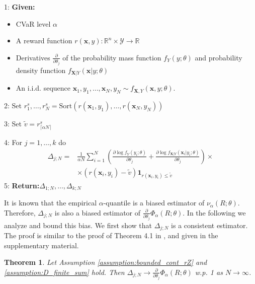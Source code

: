 \documentclass[letterpaper]{article}
\newcommand{\R}{\mathbb{R}}
\newcommand{\cvar}{\Phi_\alpha}
\newcommand{\var}{\nu_\alpha}
\newcommand{\cY}{\mathcal{Y}}
\newcommand{\bx}{\mathbf{x}}
\newcommand{\bX}{\mathbf{X}}
\newcommand{\Dth}{\frac{\partial}{\partial \theta_j}}
\newcommand{\Dt}[1]{\frac{\partial {#1}}{\partial \theta_j}}
\newcommand{\dcvar}{\Delta_{j;N}} %
\newcommand{\evar}{\tilde{v}}  %
\newcommand{\alggiven}{\textbf{Given:}}
\newcommand{\algreturn}{\textbf{Return:}}
\newtheorem{theorem}{Theorem}
\begin{document}
\begin{algorithm} \label{alg:GCVaR}
\caption{\texttt{GCVaR}}
1: \alggiven
\begin{itemize}
\item CVaR level $\alpha$
\item A reward function $r(\bx,y):\R^n\times \cY \to \R$
\item Derivatives $\Dt{}$ of the probability mass function $f_Y\left(y;\theta\right)$ and probability density function $f_{\bX|Y}\left(\bx|y;\theta\right)$
\item An i.i.d. sequence $\bx_{1},y_1,\dots,\bx_{N},y_N \sim f_{\bX,Y}(\bx,y;\theta)$.
\end{itemize}
2: Set $r_1^s,\dots,r_N^s = \textrm{Sort}\left(r(\bx_{1},y_1),\dots,r(\bx_{N},y_N)\right)$

3: Set $\evar = r_{\lceil \alpha N \rceil}^s$

4: For $j = 1,\dots,k$ do
\begin{equation*}
\begin{split}
\dcvar =& \frac{1}{\alpha N}\! \sum_{i=1}^{N} \! \left(\Dt{ \log f_{Y}\left(y_i;\theta\right)} \!+\! \Dt{ \log f_{\bX|Y}\left(\bx_{i}|y_i;\theta\right)}\right)\!\! \times\\
& \times \! \left( r(\bx_{i},y_i)-\evar \right) \mathbf{1}_{r(\bx_{i},y_i)\leq \evar}
\end{split}
\end{equation*}
5: \algreturn $\Delta_{1;N},\dots,\Delta_{k;N}$
\end{algorithm}

It is known that the empirical $\alpha$-quantile is a biased estimator of $\var(R;\theta)$. Therefore, $\dcvar$ is also a biased estimator of $\Dth\cvar (R;\theta)$. In the following we analyze and bound this bias.
We first show that $\dcvar$ is a consistent estimator. The proof is similar to the proof of Theorem 4.1 in \cite{hong_simulating_2009}, and given in the supplementary material.

\begin{theorem}\label{thm:consistent}
Let Assumption \ref{assumption:bounded_cont_rZ} and \ref{assumption:D_finite_sum} hold. Then $\dcvar \to \Dth\cvar (R;\theta)$ w.p. 1 as $N \to \infty$.
\end{theorem}
\end{document}
